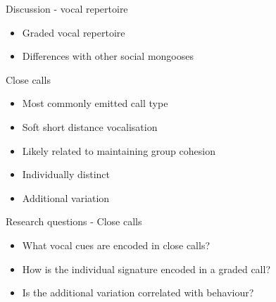 \documentclass[xcolor=dvipsnames]{beamer}
\begin{document}
\begin{frame}{Discussion - vocal repertoire}
\begin{itemize}
\item Graded vocal repertoire
\item Differences with other social mongooses
\end{itemize}
\end{frame}
\begin{frame}{Close calls}
\begin{itemize}
\item Most commonly emitted call type
\item Soft short distance vocalisation
\item  Likely related to maintaining group cohesion
\item Individually distinct
\item Additional variation
\end{itemize}
\end{frame}
\begin{frame}{Research questions - Close calls}
\begin{itemize}
\itemsep10mm
\item<1-> What vocal cues are encoded in close calls?
\vspace*{1cm}
\item<2-> How is the individual signature encoded in a graded call?
\vspace*{1cm}
\item<3-> Is the additional variation correlated with behaviour?
\end{itemize}
\end{frame}
\end{document}
